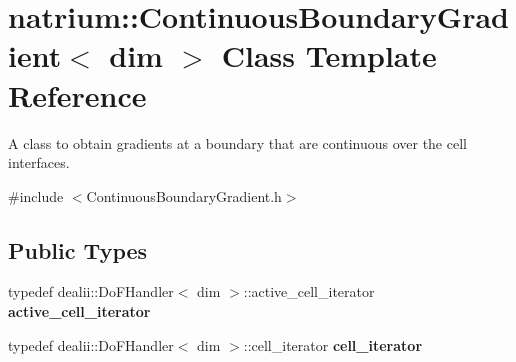 \hypertarget{classnatrium_1_1ContinuousBoundaryGradient}{
\section{natrium::ContinuousBoundaryGradient$<$ dim $>$ Class Template Reference}
\label{classnatrium_1_1ContinuousBoundaryGradient}
}


A class to obtain gradients at a boundary that are continuous over the cell interfaces.  


{\ttfamily \#include $<$ContinuousBoundaryGradient.h$>$}\subsection*{Public Types}
\begin{DoxyCompactItemize}
\item 
\hypertarget{classnatrium_1_1ContinuousBoundaryGradient_a569e86febfc24a8e43e667ac979f72a5}{
typedef dealii::DoFHandler$<$ dim $>$::active\_\-cell\_\-iterator {\bfseries active\_\-cell\_\-iterator}}
\label{classnatrium_1_1ContinuousBoundaryGradient_a569e86febfc24a8e43e667ac979f72a5}

\item 
\hypertarget{classnatrium_1_1ContinuousBoundaryGradient_a00191cdc7ecd0dc6a6d315d9822fe1d8}{
typedef dealii::DoFHandler$<$ dim $>$::cell\_\-iterator {\bfseries cell\_\-iterator}}
\label{classnatrium_1_1ContinuousBoundaryGradient_a00191cdc7ecd0dc6a6d315d9822fe1d8}

\end{DoxyCompactItemize}
